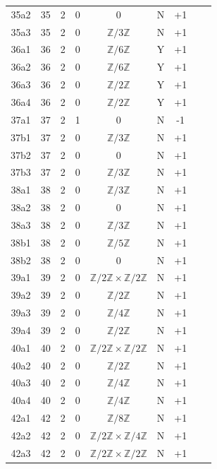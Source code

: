 \begin{table}[htbp]
\begin{tabular}{ccccccccc}
35a2 & 35 & 2 & 0 & 0 & N & +1 &  &  \\
35a3 & 35 & 2 & 0 & $\mathbb{Z}/3\mathbb{Z}$ & N & +1 &  &  \\
36a1 & 36 & 2 & 0 & $\mathbb{Z}/6\mathbb{Z}$ & Y & +1 &  &  \\
36a2 & 36 & 2 & 0 & $\mathbb{Z}/6\mathbb{Z}$ & Y & +1 &  &  \\
36a3 & 36 & 2 & 0 & $\mathbb{Z}/2\mathbb{Z}$ & Y & +1 &  &  \\
36a4 & 36 & 2 & 0 & $\mathbb{Z}/2\mathbb{Z}$ & Y & +1 &  &  \\
37a1 & 37 & 2 & 1 & 0 & N & -1 &  &  \\
37b1 & 37 & 2 & 0 & $\mathbb{Z}/3\mathbb{Z}$ & N & +1 &  &  \\
37b2 & 37 & 2 & 0 & 0 & N & +1 &  &  \\
37b3 & 37 & 2 & 0 & $\mathbb{Z}/3\mathbb{Z}$ & N & +1 &  &  \\
38a1 & 38 & 2 & 0 & $\mathbb{Z}/3\mathbb{Z}$ & N & +1 &  &  \\
38a2 & 38 & 2 & 0 & 0 & N & +1 &  &  \\
38a3 & 38 & 2 & 0 & $\mathbb{Z}/3\mathbb{Z}$ & N & +1 &  &  \\
38b1 & 38 & 2 & 0 & $\mathbb{Z}/5\mathbb{Z}$ & N & +1 &  &  \\
38b2 & 38 & 2 & 0 & 0 & N & +1 &  &  \\
39a1 & 39 & 2 & 0 & $\mathbb{Z}/2\mathbb{Z} \times \mathbb{Z}/2\mathbb{Z}$ & N & +1 &  &  \\
39a2 & 39 & 2 & 0 & $\mathbb{Z}/2\mathbb{Z}$ & N & +1 &  &  \\
39a3 & 39 & 2 & 0 & $\mathbb{Z}/4\mathbb{Z}$ & N & +1 &  &  \\
39a4 & 39 & 2 & 0 & $\mathbb{Z}/2\mathbb{Z}$ & N & +1 &  &  \\
40a1 & 40 & 2 & 0 & $\mathbb{Z}/2\mathbb{Z} \times \mathbb{Z}/2\mathbb{Z}$ & N & +1 &  &  \\
40a2 & 40 & 2 & 0 & $\mathbb{Z}/2\mathbb{Z}$ & N & +1 &  &  \\
40a3 & 40 & 2 & 0 & $\mathbb{Z}/4\mathbb{Z}$ & N & +1 &  &  \\
40a4 & 40 & 2 & 0 & $\mathbb{Z}/4\mathbb{Z}$ & N & +1 &  &  \\
42a1 & 42 & 2 & 0 & $\mathbb{Z}/8\mathbb{Z}$ & N & +1 &  &  \\
42a2 & 42 & 2 & 0 & $\mathbb{Z}/2\mathbb{Z} \times \mathbb{Z}/4\mathbb{Z}$ & N & +1 &  &  \\
42a3 & 42 & 2 & 0 & $\mathbb{Z}/2\mathbb{Z} \times \mathbb{Z}/2\mathbb{Z}$ & N & +1 &  &  \\

\end{tabular}
\end{table}

